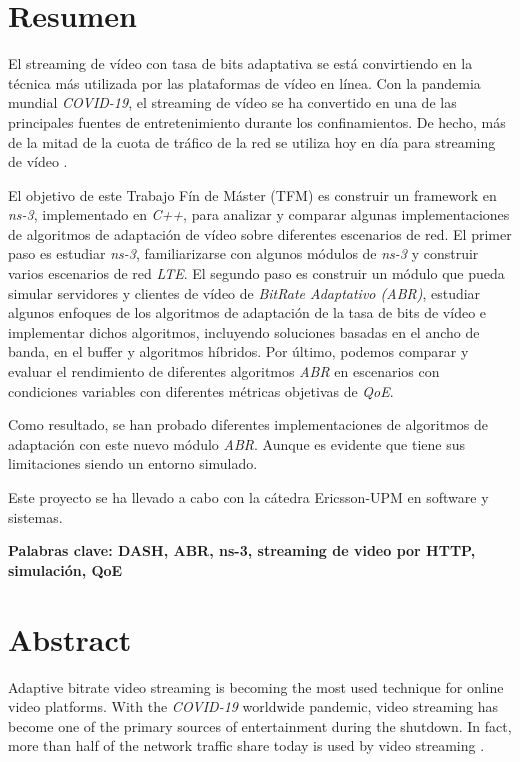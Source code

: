 \cleardoublepage
{}
\chapter*{Resumen}

El streaming de vídeo con tasa de bits adaptativa se está convirtiendo 
en la técnica más utilizada por las plataformas de vídeo en línea. 
Con la pandemia mundial \textit{COVID-19}, el streaming de vídeo se ha convertido 
en una de las principales fuentes de entretenimiento durante los confinamientos. 
De hecho, más de la mitad de la cuota de tráfico de la red se utiliza hoy en 
día para streaming de vídeo \cite{sandvine1}.

El objetivo de este Trabajo Fín de Máster (TFM) es construir un framework en \textit{ns-3},
implementado en \textit{C++}, para analizar y comparar algunas implementaciones de algoritmos de adaptación de vídeo
sobre diferentes escenarios de red. El primer paso 
es estudiar \textit{ns-3}, familiarizarse con algunos módulos de \textit{ns-3} y construir varios 
escenarios de red \textit{LTE}. El segundo paso es construir un módulo que pueda simular 
servidores y clientes de vídeo de \textit{BitRate Adaptativo (ABR)}, estudiar algunos enfoques de los algoritmos
de adaptación de la tasa de bits de vídeo e implementar dichos algoritmos, 
incluyendo soluciones basadas en el ancho de banda, en el buffer y algoritmos 
híbridos. 
Por último, podemos comparar y evaluar el rendimiento de diferentes algoritmos 
\textit{ABR} en escenarios con condiciones variables con diferentes métricas objetivas 
de \textit{QoE}.

Como resultado, se han probado diferentes implementaciones de algoritmos de adaptación con
este nuevo módulo \textit{ABR}. Aunque es evidente que tiene sus limitaciones siendo un entorno simulado.

Este proyecto se ha llevado a cabo con la cátedra Ericsson-UPM en software y sistemas.



\vfill
\textbf{Palabras clave: DASH, ABR, ns-3, streaming de video por HTTP, simulación, QoE} 


\cleardoublepage
{}
\chapter*{Abstract}

Adaptive bitrate video streaming is becoming the most used technique for online
video platforms. With the \textit{COVID-19} worldwide pandemic, video streaming has become
one of the primary sources of entertainment during the shutdown. In fact, more
than half of the network traffic share today is used by video streaming \cite{sandvine1}.

